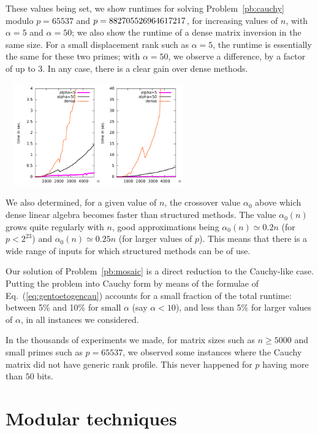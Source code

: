 \documentclass[sigconf]{acmart}
\theoremstyle{acmdefinition}
\begin{document}
These values being set, we show runtimes for solving
Problem~\ref{pb:cauchy} modulo $p=65537$ and
$p=8827055\-26964617217$, for increasing values of $n$, with
$\alpha=5$ and $\alpha=50$; we also show the runtime of a dense
matrix inversion in the same size. For a small displacement rank
such as $\alpha=5$, the runtime is essentially the same for these two
primes; with $\alpha=50$, we observe a difference, by a factor of up to 3. In any case, there is a clear gain
over dense methods.

\includegraphics[width=8cm,height=4.4cm]{large_n-eschost-desktop.pdf}

We also determined, for a given value of $n$, the crossover value
$\alpha_0$ above which dense linear algebra becomes faster than
structured methods.  The value $\alpha_0(n)$ grows quite regularly
with $n$, good approximations being $\alpha_0(n) \simeq 0.2 n$ (for $p
< 2^{23}$) and $\alpha_0(n) \simeq 0.25 n$ (for larger values of
$p$). This means that there is a wide range of inputs for which
structured methods can be of use.

Our solution of Problem~\ref{pb:mosaic} is a direct reduction to the
Cauchy-like case. Putting the problem into Cauchy form by means of the
formulae of Eq.~(\ref{eq:gentoetogencau}) accounts for a small
fraction of the total runtime: between 5\% and 10\% for small $\alpha$
(say $\alpha < 10$), and less than 5\% for larger values of $\alpha$,
in all instances we considered.  

In the thousands of experiments we made, for matrix
sizes such as $n \ge 5000$ and small primes such as $p=65537$, we
observed some instances where the Cauchy matrix did not have generic
rank profile. This never happened for $p$ having more than $50$ bits.


\vspace{-5px}
\section{Modular techniques}\label{sec:lifting}
\end{document}
